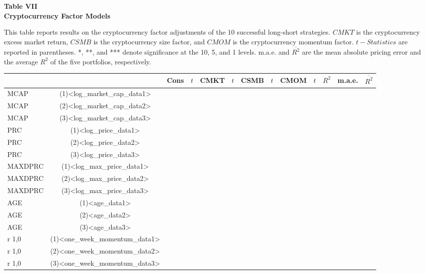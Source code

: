 \documentclass{article}
\begin{document}
    \begin{center}
        \textbf{
        Table VII
        \\
        Cryptocurrency Factor Models
        }
        \begin{justify}
            \footnotesize{
                This table reports results on the cryptocurrency factor adjustments of the 10 successful long-short strategies. $CMKT$ is the cryptocurrency excess market return, $CSMB$ is the cryptocurrency size factor, and $CMOM$ is the cryptocurrency momentum factor. $t-Statistics$ are reported in parentheses. *, **, and *** denote significance at the 10, 5, and 1 levels. m.a.e. and $\overline{R^2}$ are the mean absolute pricing error and the average $R^2$ of the five portfolios, respectively.
            }
        \end{justify}
        \-
        \begin{tabular}{lcccccccccccr}
            \toprule
            & & Cons & $t$ & CMKT & $t$ & CSMB & $t$ & CMOM & $t$ & $R^2$ & m.a.e. & $\overline{R^2}$
            \\
            \midrule
            MCAP & (1)<log_market_cap_data1>
            \\
            MCAP & (2)<log_market_cap_data2>
            \\
            MCAP & (3)<log_market_cap_data3>
            \\
            PRC & (1)<log_price_data1>
            \\
            PRC & (2)<log_price_data2>
            \\
            PRC & (3)<log_price_data3>
            \\
            MAXDPRC & (1)<log_max_price_data1>
            \\
            MAXDPRC & (2)<log_max_price_data2>
            \\
            MAXDPRC & (3)<log_max_price_data3>
            \\
            AGE & (1)<age_data1>
            \\
            AGE & (2)<age_data2>
            \\
            AGE & (3)<age_data3>
            \\
            r 1,0 & (1)<one_week_momentum_data1>
            \\
            r 1,0 & (2)<one_week_momentum_data2>
            \\
            r 1,0 & (3)<one_week_momentum_data3>
            \\

\end{tabular}
\end{center}
\end{document}
